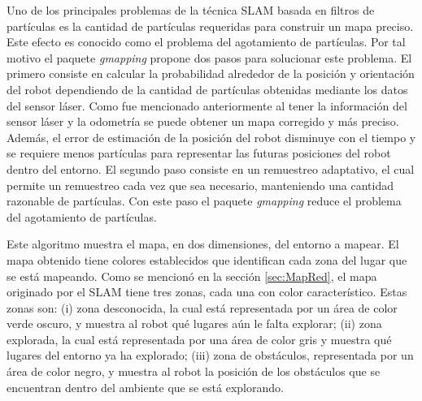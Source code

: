 Uno de los principales problemas de la técnica SLAM basada en filtros de partículas es la 
cantidad de partículas requeridas para construir un mapa preciso. Este efecto es conocido 
como el problema del agotamiento de partículas. Por tal motivo el paquete \textit{gmapping} 
propone dos pasos para solucionar este problema. El primero consiste en calcular la probabilidad 
alrededor de la posición y orientación del robot dependiendo de la cantidad de partículas 
obtenidas mediante los datos del sensor láser. Como fue mencionado anteriormente al tener 
la información del sensor láser y la odometría se puede obtener un mapa corregido y más 
preciso. Además, el error de estimación de la posición del robot disminuye con el tiempo y 
se requiere menos partículas para representar las futuras posiciones del robot dentro del 
entorno. El segundo paso consiste en un remuestreo adaptativo, el cual permite un remuestreo 
cada vez que sea necesario, manteniendo una cantidad razonable de partículas. Con este paso 
el paquete \textit{gmapping} reduce el problema del agotamiento de partículas.

Este algoritmo muestra el mapa, en dos dimensiones, del entorno a mapear. El mapa obtenido
tiene colores establecidos que identifican cada zona del lugar que se está mapeando. Como 
se mencionó en la sección \ref{sec:MapRed}, el mapa originado por el SLAM tiene tres zonas,
cada una con color característico. Estas zonas son: (i) zona desconocida, la cual está 
representada por un área de color verde oscuro, y muestra al robot qué lugares aún le falta 
explorar; (ii) zona explorada, la cual está representada por una área de color gris y muestra 
qué lugares del entorno ya ha explorado; (iii) zona de obstáculos, representada por un área 
de color negro, y muestra al robot la posición de los obstáculos que se encuentran dentro 
del ambiente que se está explorando.


